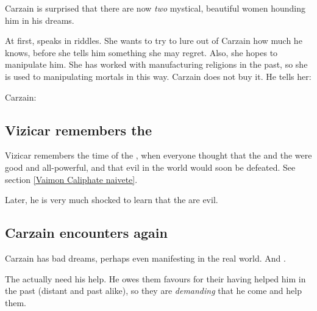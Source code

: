 Carzain is surprised that there are now \emph{two} mystical, beautiful women hounding him in his dreams. 

At first, \Cishiel speaks in riddles. 
She wants to try to lure out of Carzain how much he knows, before she tells him something she may regret. 
Also, she hopes to manipulate him. 
She has worked with manufacturing religions in the past, so she is used to manipulating mortals in this way.
Carzain does not buy it.
He tells her:

\begin{prose}
  Carzain:
\end{prose}










\subsection{Vizicar remembers the \angels}
Vizicar remembers the time of the \VaimonCaliphate, when everyone thought that the \Sephiroth{} and the \angels{} were good and all-powerful, and that evil in the world would soon be defeated. See section \ref{Vaimon Caliphate naivete}.

Later, he is very much shocked to learn that the \resphain{} are evil.







\subsection{Carzain encounters \vorcanths{} again}
Carzain has bad dreams, perhaps even manifesting in the real world. 
And . 

The \vorcanths{} actually need his help. 
He owes them favours for their having helped him in the past (distant and  past alike), so they are \emph{demanding} that he come and help them. 









